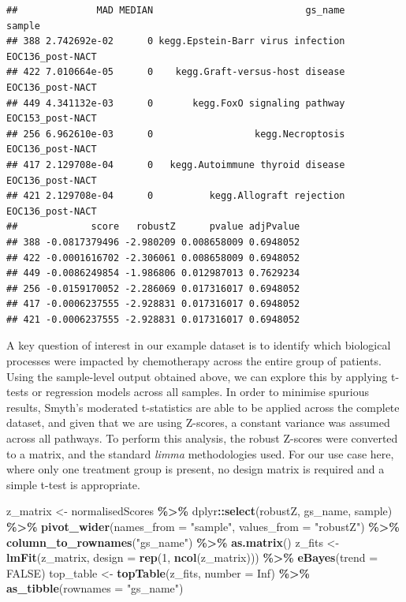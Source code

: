 \documentclass[9pt,a4paper,]{extarticle}
\newenvironment{Shaded}{\begin{snugshade}}{\end{snugshade}}
\newcommand{\AttributeTok}[1]{\textcolor[rgb]{0.13,0.29,0.53}{#1}}
\newcommand{\ConstantTok}[1]{\textcolor[rgb]{0.56,0.35,0.01}{#1}}
\newcommand{\DecValTok}[1]{\textcolor[rgb]{0.00,0.00,0.81}{#1}}
\newcommand{\FunctionTok}[1]{\textcolor[rgb]{0.13,0.29,0.53}{\textbf{#1}}}
\newcommand{\NormalTok}[1]{#1}
\newcommand{\OtherTok}[1]{\textcolor[rgb]{0.56,0.35,0.01}{#1}}
\newcommand{\SpecialCharTok}[1]{\textcolor[rgb]{0.81,0.36,0.00}{\textbf{#1}}}
\newcommand{\StringTok}[1]{\textcolor[rgb]{0.31,0.60,0.02}{#1}}
\begin{document}
\begin{verbatim}
##              MAD MEDIAN                           gs_name           sample
## 388 2.742692e-02      0 kegg.Epstein-Barr virus infection EOC136_post-NACT
## 422 7.010664e-05      0    kegg.Graft-versus-host disease EOC136_post-NACT
## 449 4.341132e-03      0       kegg.FoxO signaling pathway EOC153_post-NACT
## 256 6.962610e-03      0                  kegg.Necroptosis EOC136_post-NACT
## 417 2.129708e-04      0   kegg.Autoimmune thyroid disease EOC136_post-NACT
## 421 2.129708e-04      0          kegg.Allograft rejection EOC136_post-NACT
##             score   robustZ      pvalue adjPvalue
## 388 -0.0817379496 -2.980209 0.008658009 0.6948052
## 422 -0.0001616702 -2.306061 0.008658009 0.6948052
## 449 -0.0086249854 -1.986806 0.012987013 0.7629234
## 256 -0.0159170052 -2.286069 0.017316017 0.6948052
## 417 -0.0006237555 -2.928831 0.017316017 0.6948052
## 421 -0.0006237555 -2.928831 0.017316017 0.6948052
\end{verbatim}

A key question of interest in our example dataset is to identify which biological processes were impacted by chemotherapy across the entire group of patients.
Using the sample-level output obtained above, we can explore this by applying t-tests or regression models across all samples.
In order to minimise spurious results, Smyth's moderated t-statistics\citep{Smyth_2004} are able to be applied across the complete dataset, and given that we are using Z-scores, a constant variance was assumed across all pathways.
To perform this analysis, the robust Z-scores were converted to a matrix, and the standard \emph{limma} methodologies used.
For our use case here, where only one treatment group is present, no design matrix is required and a simple t-test is appropriate.

\begin{Shaded}
\begin{Highlighting}[]
\NormalTok{z\_matrix }\OtherTok{\textless{}{-}}\NormalTok{ normalisedScores }\SpecialCharTok{\%\textgreater{}\%}
\NormalTok{  dplyr}\SpecialCharTok{::}\FunctionTok{select}\NormalTok{(robustZ, gs\_name, sample) }\SpecialCharTok{\%\textgreater{}\%}
  \FunctionTok{pivot\_wider}\NormalTok{(}\AttributeTok{names\_from =} \StringTok{"sample"}\NormalTok{, }\AttributeTok{values\_from =} \StringTok{"robustZ"}\NormalTok{) }\SpecialCharTok{\%\textgreater{}\%}
  \FunctionTok{column\_to\_rownames}\NormalTok{(}\StringTok{"gs\_name"}\NormalTok{) }\SpecialCharTok{\%\textgreater{}\%}
  \FunctionTok{as.matrix}\NormalTok{()}
\NormalTok{z\_fits }\OtherTok{\textless{}{-}} \FunctionTok{lmFit}\NormalTok{(z\_matrix, }\AttributeTok{design =} \FunctionTok{rep}\NormalTok{(}\DecValTok{1}\NormalTok{, }\FunctionTok{ncol}\NormalTok{(z\_matrix))) }\SpecialCharTok{\%\textgreater{}\%} 
  \FunctionTok{eBayes}\NormalTok{(}\AttributeTok{trend =} \ConstantTok{FALSE}\NormalTok{)}
\NormalTok{top\_table }\OtherTok{\textless{}{-}} \FunctionTok{topTable}\NormalTok{(z\_fits, }\AttributeTok{number =} \ConstantTok{Inf}\NormalTok{) }\SpecialCharTok{\%\textgreater{}\%}
  \FunctionTok{as\_tibble}\NormalTok{(}\AttributeTok{rownames =} \StringTok{"gs\_name"}\NormalTok{)}
\end{Highlighting}
\end{Shaded}
\end{document}
